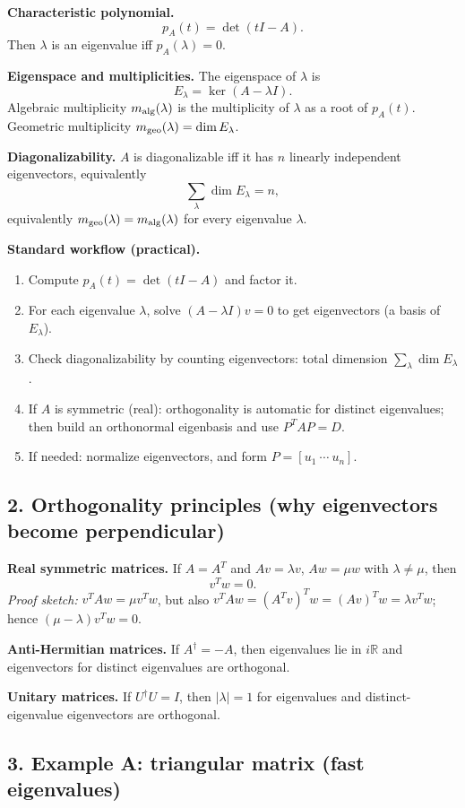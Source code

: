 \documentclass[12pt,a4paper]{article}
\theoremstyle{plain}
\theoremstyle{definition}      %
\begin{document}
\textbf{Characteristic polynomial.}
\[
p_A(t)=\det(tI-A).
\]
Then $\lambda$ is an eigenvalue iff $p_A(\lambda)=0$.

\textbf{Eigenspace and multiplicities.}
The eigenspace of $\lambda$ is
\[
E_\lambda=\ker(A-\lambda I).
\]
Algebraic multiplicity $m_{\rm alg}(\lambda)$ is the multiplicity of $\lambda$ as a root of $p_A(t)$.
Geometric multiplicity $m_{\rm geo}(\lambda)=\dim E_\lambda$.

\textbf{Diagonalizability.}
$A$ is diagonalizable iff it has $n$ linearly independent eigenvectors, equivalently
\[
\sum_{\lambda} \dim E_\lambda = n,
\]
equivalently $m_{\rm geo}(\lambda)=m_{\rm alg}(\lambda)$ for every eigenvalue $\lambda$.

\textbf{Standard workflow (practical).}
\begin{enumerate}
	\item Compute $p_A(t)=\det(tI-A)$ and factor it.
	\item For each eigenvalue $\lambda$, solve $(A-\lambda I)v=0$ to get eigenvectors (a basis of $E_\lambda$).
	\item Check diagonalizability by counting eigenvectors: total dimension $\sum_\lambda \dim E_\lambda$.
	\item If $A$ is symmetric (real): orthogonality is automatic for distinct eigenvalues; then build an orthonormal eigenbasis and use $P^TAP=D$.
	\item If needed: normalize eigenvectors, and form $P=[u_1\ \cdots\ u_n]$.
\end{enumerate}

\subsection*{2. Orthogonality principles (why eigenvectors become perpendicular)}

\textbf{Real symmetric matrices.}
If $A=A^T$ and $Av=\lambda v$, $Aw=\mu w$ with $\lambda\neq\mu$, then
\[
v^T w=0.
\]
\emph{Proof sketch:} $v^TAw=\mu v^Tw$, but also $v^TAw=(A^Tv)^Tw=(Av)^Tw=\lambda v^Tw$; hence $(\mu-\lambda)v^Tw=0$.

\textbf{Anti-Hermitian matrices.}
If $A^\dagger=-A$, then eigenvalues lie in $i\mathbb R$ and eigenvectors for distinct eigenvalues are orthogonal.

\textbf{Unitary matrices.}
If $U^\dagger U=I$, then $|\lambda|=1$ for eigenvalues and distinct-eigenvalue eigenvectors are orthogonal.

\subsection*{3. Example A: triangular matrix (fast eigenvalues)}
\end{document}
